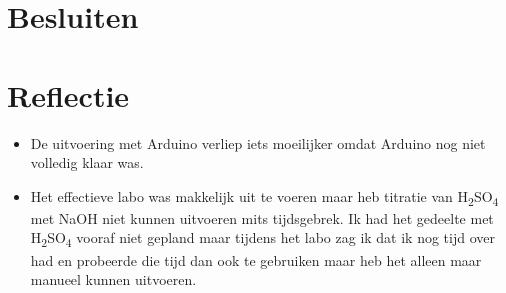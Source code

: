 \documentclass[10pt,twoside]{report}
\begin{document}
\section{Besluiten}

\section{Reflectie}
\begin{itemize}
    \item De uitvoering met Arduino verliep iets moeilijker omdat Arduino nog niet volledig klaar was.
    \item Het effectieve labo was makkelijk uit te voeren maar heb titratie van H\textsubscript{2}SO\textsubscript{4} met NaOH niet kunnen uitvoeren mits tijdsgebrek. Ik had het gedeelte met H\textsubscript{2}SO\textsubscript{4} vooraf niet gepland maar tijdens het labo zag ik dat ik nog tijd over had en probeerde die tijd dan ook te gebruiken maar heb het alleen maar manueel kunnen uitvoeren.
\end{itemize}

\printbibliography
\end{document}
